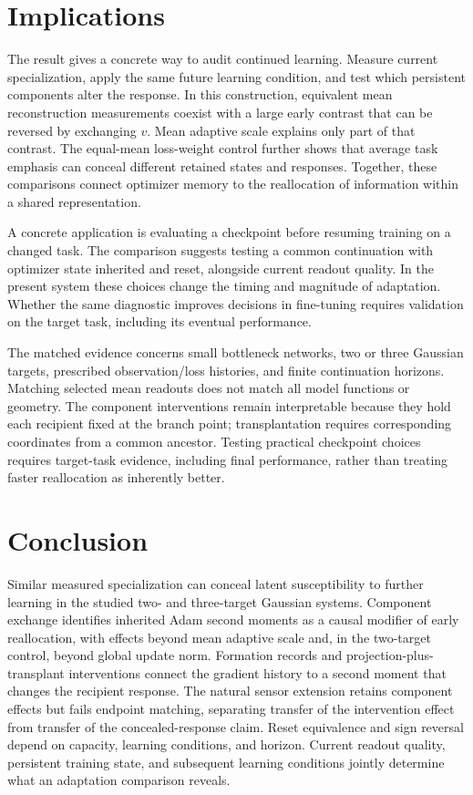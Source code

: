 \section{Implications}
\label{sec:scope}
The result gives a concrete way to audit continued learning. Measure current specialization, apply the same future learning condition, and test which persistent components alter the response. In this construction, equivalent mean reconstruction measurements coexist with a large early contrast that can be reversed by exchanging $v$. Mean adaptive scale explains only part of that contrast. The equal-mean loss-weight control further shows that average task emphasis can conceal different retained states and responses. Together, these comparisons connect optimizer memory to the reallocation of information within a shared representation.

A concrete application is evaluating a checkpoint before resuming training on a changed task. The comparison suggests testing a common continuation with optimizer state inherited and reset, alongside current readout quality. In the present system these choices change the timing and magnitude of adaptation. Whether the same diagnostic improves decisions in fine-tuning requires validation on the target task, including its eventual performance.

The matched evidence concerns small bottleneck networks, two or three Gaussian targets, prescribed observation/loss histories, and finite continuation horizons. Matching selected mean readouts does not match all model functions or geometry. The component interventions remain interpretable because they hold each recipient fixed at the branch point; transplantation requires corresponding coordinates from a common ancestor. Testing practical checkpoint choices requires target-task evidence, including final performance, rather than treating faster reallocation as inherently better.

\section{Conclusion}
Similar measured specialization can conceal latent susceptibility to further learning in the studied two- and three-target Gaussian systems. Component exchange identifies inherited Adam second moments as a causal modifier of early reallocation, with effects beyond mean adaptive scale and, in the two-target control, beyond global update norm. Formation records and projection-plus-transplant interventions connect the gradient history to a second moment that changes the recipient response. The natural sensor extension retains component effects but fails endpoint matching, separating transfer of the intervention effect from transfer of the concealed-response claim. Reset equivalence and sign reversal depend on capacity, learning conditions, and horizon. Current readout quality, persistent training state, and subsequent learning conditions jointly determine what an adaptation comparison reveals.

